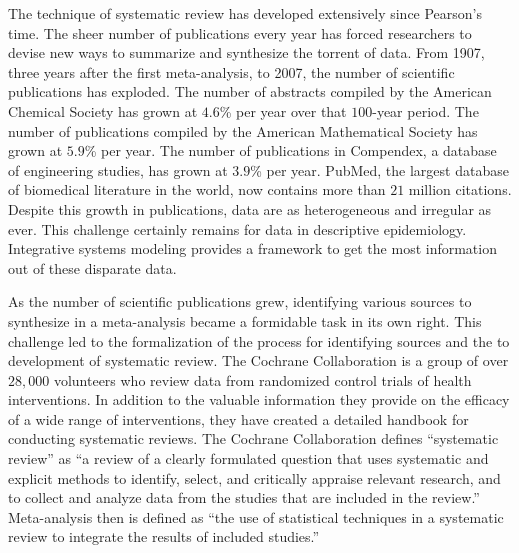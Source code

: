 The technique of systematic review has developed extensively since Pearson's time. The
sheer number of publications every year has forced researchers to
devise new ways to summarize and synthesize the torrent of data. From
1907, three years after the first meta-analysis, to 2007, the number of
scientific publications has exploded. The number of abstracts compiled by the
American Chemical Society has grown at $4.6$\% per year over that
$100$-year period. The number of publications compiled by the American Mathematical
Society has grown at $5.9$\% per year.  The number of publications in Compendex, a
database of engineering studies, has grown at $3.9$\% per year.
\cite{Larsen_Rate_2010} PubMed, the largest database of biomedical
literature in the world, now contains more than $21$ million citations.
\cite{us_national_library_of_medicine_national_institutes_of_health_pubmed_2012} Despite this growth in publications, data are
as heterogeneous and irregular as ever. This challenge certainly remains
for data in descriptive epidemiology. Integrative systems modeling
provides a framework to get the most information out of these disparate data.

As the number of scientific publications grew, identifying various
sources to synthesize in a meta-analysis became a formidable task in
its own right. This challenge led to the formalization of the process
for identifying sources and the to development of systematic review.
The Cochrane Collaboration is a
group of over $28,000$ volunteers who review data from randomized
control trials of health interventions.\cite{_cochrane_2012} In addition to the valuable information
they provide on the efficacy of a wide range of interventions, they have
created a detailed handbook for conducting systematic
reviews. The Cochrane Collaboration defines ``systematic review'' as ``a review of a
clearly formulated question that uses systematic and explicit methods
to identify, select, and critically appraise relevant research, and to
collect and analyze data from the studies that are included in the
review.'' Meta-analysis then is defined as ``the use of statistical
techniques in a systematic review to integrate the results of included
studies.''\cite{Green_Systematic_2005}

